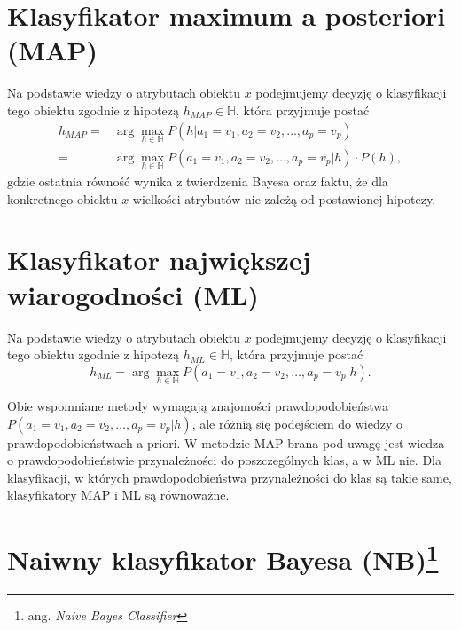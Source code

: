 \documentclass[]{book}
\let\rmarkdownfootnote\footnote%
\def\footnote{\protect\rmarkdownfootnote}
\theoremstyle{plain}
\theoremstyle{definition}
\theoremstyle{definition}
\theoremstyle{definition}
\theoremstyle{definition}
\theoremstyle{remark}
\let\BeginKnitrBlock\begin \let\EndKnitrBlock\end
\begin{document}
\hypertarget{klasyfikator-maximum-a-posteriori-map}{%
\section{Klasyfikator maximum a posteriori (MAP)}\label{klasyfikator-maximum-a-posteriori-map}}

Na podstawie wiedzy o atrybutach obiektu \(x\) podejmujemy decyzję o klasyfikacji tego obiektu zgodnie z hipotezą \(h_{MAP}\in \mathbb{H}\), która przyjmuje postać
\begin{align}\label{MAP}
        h_{MAP}=&\operatorname{arg}\max_{h\in \mathbb{H}}P(h|a_1=v_1, a_2=v_2,\ldots,a_p=v_p)\\
            =& \operatorname{arg}\max_{h\in \mathbb{H}}P(a_1=v_1, a_2=v_2,\ldots,a_p=v_p|h)\cdot P(h),
\end{align}
gdzie ostatnia równość wynika z twierdzenia Bayesa oraz faktu, że dla konkretnego obiektu \(x\) wielkości atrybutów nie zależą od postawionej hipotezy.

\hypertarget{klasyfikator-najwiekszej-wiarogodnosci-ml}{%
\section{Klasyfikator największej wiarogodności (ML)}\label{klasyfikator-najwiekszej-wiarogodnosci-ml}}

Na podstawie wiedzy o atrybutach obiektu \(x\) podejmujemy decyzję o klasyfikacji tego obiektu zgodnie z hipotezą \(h_{ML}\in \mathbb{H}\), która przyjmuje postać
\begin{equation}\label{ML}
        h_{ML}=\operatorname{arg}\max_{h\in \mathbb{H}}P(a_1=v_1, a_2=v_2,\ldots,a_p=v_p|h).
\end{equation}

\BeginKnitrBlock{remark}
{}Obie wspomniane metody wymagają znajomości prawdopodobieństwa \(P(a_1=v_1,a_2=v_2,\ldots,a_p=v_p|h)\), ale różnią się podejściem do wiedzy o prawdopodobieństwach a priori. W metodzie MAP brana pod uwagę jest wiedza o prawdopodobieństwie przynależności do poszczególnych klas, a w ML nie. Dla klasyfikacji, w których prawdopodobieństwa przynależności do klas są takie same, klasyfikatory MAP i ML są równoważne.
\EndKnitrBlock{remark}

\hypertarget{naiwny-klasyfikator-bayesa-nb}{%
\section[Naiwny klasyfikator Bayesa (NB)]{\texorpdfstring{Naiwny klasyfikator Bayesa (NB)\footnote{ang. \emph{Naive Bayes Classifier}}}{Naiwny klasyfikator Bayesa (NB)}}\label{naiwny-klasyfikator-bayesa-nb}}
\end{document}
